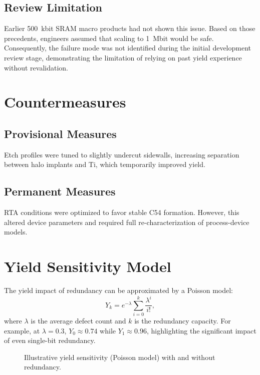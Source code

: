 \documentclass[conference]{IEEEtran}
\begin{document}
\subsection{Review Limitation}
Earlier 500~kbit SRAM macro products had not shown this issue. Based on those precedents, engineers assumed that scaling to \SI{1}{Mbit} would be safe.  
Consequently, the failure mode was not identified during the initial development review stage, demonstrating the limitation of relying on past yield experience without revalidation.

\section{Countermeasures}
\subsection{Provisional Measures}
Etch profiles were tuned to slightly undercut sidewalls, increasing separation between halo implants and Ti, which temporarily improved yield.  

\subsection{Permanent Measures}
RTA conditions were optimized to favor stable C54 formation. However, this altered device parameters and required full re-characterization of process-device models.

\section{Yield Sensitivity Model}
The yield impact of redundancy can be approximated by a Poisson model:
\[
Y_k = e^{-\lambda} \sum_{i=0}^{k} \frac{\lambda^i}{i!},
\]
where $\lambda$ is the average defect count and $k$ is the redundancy capacity.  
For example, at $\lambda=0.3$, $Y_0 \approx 0.74$ while $Y_1 \approx 0.96$, highlighting the significant impact of even single-bit redundancy.

\begin{figure}[!t]
  \centering
  \caption{Illustrative yield sensitivity (Poisson model) with and without redundancy.}
  \label{fig:yield}
\end{figure}
\end{document}
